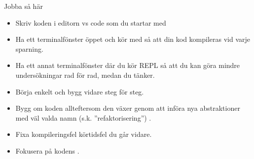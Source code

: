 \begin{SlideExtra}{Jobba så här}
\begin{itemize}
  \item Skriv koden i editorn vs code som du startar med 
  \item Ha ett terminalfönster öppet och kör  med  så att din kod kompileras vid varje sparning.
  \item Ha ett annat terminalfönster där du kör REPL så att du kan göra mindre undersökningar rad för rad, medan du tänker.
  \item Börja enkelt och bygg vidare steg för steg.
  \item Bygg om koden allteftersom den växer genom att införa nya abstraktioner med väl valda namn (s.k. ''refaktorisering'') .
  \item Fixa  kompileringsfel \code{||} körtidsfel  du går vidare.
  \item Fokusera på kodens .
\end{itemize}

\end{SlideExtra}

\fi
